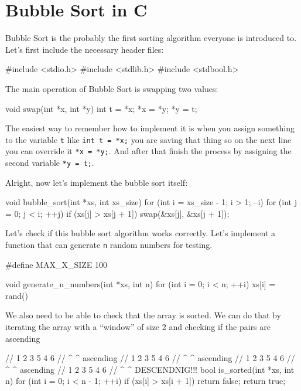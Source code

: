 \documentclass{article}
\newenvironment{code}{\footnotesize\verbatim}{\endverbatim\normalsize}
\begin{document}
\section{Bubble Sort in C}

Bubble Sort is the probably the first sorting algorithm everyone is introduced to. Let's first include the necessary header files:

\begin{code}
#include <stdio.h>
#include <stdlib.h>
#include <stdbool.h>
\end{code}

The main operation of Bubble Sort is swapping two values:

\begin{code}
void swap(int *x, int *y)
{
    int t = *x;
    *x = *y;
    *y = t;
}   
\end{code}

The easiest way to remember how to implement it is when you assign something to the variable \verb|t| like \verb|int t = *x;| you are saving that thing so on the next line you can override it \verb|*x = *y;|. And after that finish the process by assigning the second variable \verb|*y = t;|.


Alright, now let's implement the bubble sort itself:

\begin{code}
void bubble_sort(int *xs, int xs_size)
{
   for (int i = xs_size - 1; i > 1; --i) {
       for (int j = 0; j < i; ++j) {
           if (xs[j] > xs[j + 1]) {
               swap(&xs[j], &xs[j + 1]);
           }
       }
   }
}
\end{code}

Let's check if this bubble sort algorithm works correctly. Let's implement a function that can generate \verb|n| random numbers for testing.

\begin{code}
#define MAX_X_SIZE 100

void generate_n_numbers(int *xs, int n)
{
    for (int i = 0; i < n; ++i) {
        xs[i] = rand() %
    }
}
\end{code}

We also need to be able to check that the array is sorted. We can do that by iterating the array with a ``window'' of size 2 and checking if the pairs are ascending

\pagebreak

\begin{code}
// 1 2 3 5 4 6
// ^ ^ ascending
// 1 2 3 5 4 6
//   ^ ^ ascending
// 1 2 3 5 4 6
//     ^ ^ ascending
// 1 2 3 5 4 6
//       ^ ^ DESCENDNIG!!!
bool is_sorted(int *xs, int n)
{
    for (int i = 0; i < n - 1; ++i) {
        if (xs[i] > xs[i + 1]) {
            return false;
        }
    }
    return true;
}
\end{code}
\end{document}
